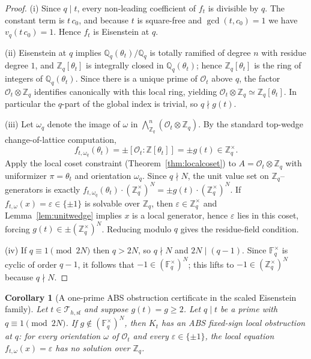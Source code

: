 \documentclass[11pt,letterpaper]{amsart}
\newcommand{\Z}{\mathbb{Z}}
\newcommand{\Q}{\mathbb{Q}}
\newcommand{\F}{\mathbb{F}}
\newcommand{\Ocal}{\mathcal{O}}
\theoremstyle{plain}
\newtheorem{corollary}[theorem]{Corollary}
\theoremstyle{definition}
\theoremstyle{remark}
\theoremstyle{plain}
\begin{document}
\begin{proof}
(i) Since $q\mid t$, every non-leading coefficient of $f_t$ is divisible by $q$.
The constant term is $t\,c_0$, and because $t$ is square-free and $\gcd(t,c_0)=1$ we have
$v_q(t\,c_0)=1$. Hence $f_t$ is Eisenstein at $q$.

(ii) Eisenstein at $q$ implies $\Q_q(\theta_t)/\Q_q$ is totally ramified of degree $n$ with residue degree $1$,
and $\Z_q[\theta_t]$ is integrally closed in $\Q_q(\theta_t)$; hence $\Z_q[\theta_t]$ is the ring of integers
of $\Q_q(\theta_t)$.
Since there is a unique prime of $\Ocal_t$ above $q$, the factor $\Ocal_t\otimes\Z_q$ identifies canonically with this
local ring, yielding $\Ocal_t\otimes\Z_q\simeq \Z_q[\theta_t]$.
In particular the $q$-part of the global index is trivial, so $q\nmid g(t)$.

(iii) Let $\omega_q$ denote the image of $\omega$ in $\bigwedge_{\Z_q}^n(\Ocal_t\otimes\Z_q)$.
By the standard top-wedge change-of-lattice computation,
\[
f_{t,\omega_q}(\theta_t)=\pm[\Ocal_t:\Z[\theta_t]]=\pm g(t)\in\Z_q^\times.
\]
Apply the local coset constraint (Theorem~\ref{thm:localcoset}) to
$A=\Ocal_t\otimes\Z_q$ with uniformizer $\pi=\theta_t$ and orientation $\omega_q$.
Since $q\nmid N$, the unit value set on $\Z_q$--generators is exactly
$f_{t,\omega_q}(\theta_t)\cdot(\Z_q^\times)^N=\pm g(t)\cdot(\Z_q^\times)^N$.
If $f_{t,\omega}(x)=\varepsilon\in\{\pm1\}$ is solvable over $\Z_q$, then $\varepsilon\in\Z_q^\times$ and
Lemma~\ref{lem:unitwedge} implies $x$ is a local generator, hence $\varepsilon$ lies in this coset,
forcing $g(t)\in\pm(\Z_q^\times)^N$. Reducing modulo $q$ gives the residue-field condition.

(iv) If $q\equiv 1\pmod{2N}$ then $q>2N$, so $q\nmid N$ and $2N\mid (q-1)$.
Since $\F_q^\times$ is cyclic of order $q-1$, it follows that $-1\in (\F_q^\times)^N$; this lifts to
$-1\in(\Z_q^\times)^N$ because $q\nmid N$.
\end{proof}

\begin{corollary}[A one-prime \textsc{ABS} obstruction certificate in the scaled Eisenstein family]
\label{cor:scaled-one-prime-certificate-merged}
Let $t\in\mathcal{T}_{h,\mathrm{sf}}$ and suppose $g(t)=g\ge 2$.
Let $q\mid t$ be a prime with $q\equiv 1\pmod{2N}$.
If $g\notin(\F_q^\times)^N$, then $K_t$ has an \textsc{ABS} fixed-sign local obstruction at $q$:
for every orientation $\omega$ of $\Ocal_t$ and every $\varepsilon\in\{\pm1\}$,
the local equation $f_{t,\omega}(x)=\varepsilon$ has no solution over $\Z_q$.
\end{corollary}
\end{document}
